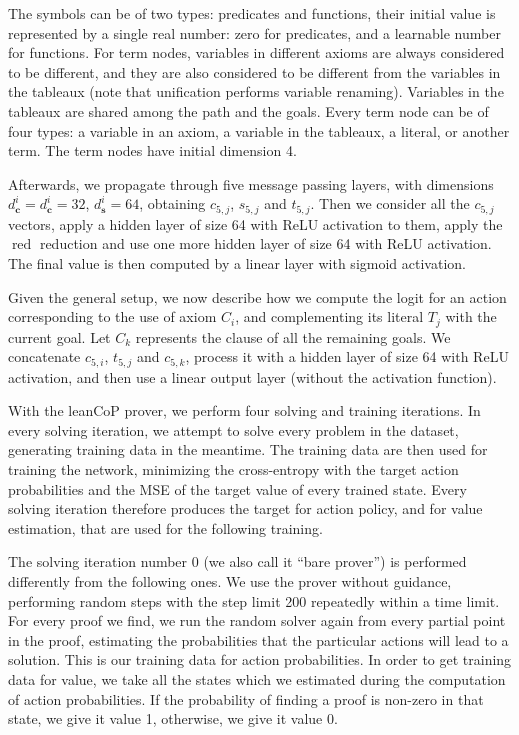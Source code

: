\documentclass{ecai}
\def\systemname#1{\textsf{#1}\xspace}
\newcommand{\lc}{\systemname{leanCoP}}
\newcommand{\red}{\mathop{\mathrm{red}}\limits}
\begin{document}
The symbols can be of two types: predicates and functions, their
initial value is represented by a single real number: zero for
predicates, and a learnable number for functions. For term nodes,
variables in different axioms are always considered to be different,
and they are also considered to be different from the variables in the
tableaux (note that unification performs variable renaming). Variables in the tableaux are shared among the path and the
goals. Every term node can be of four types: a variable in an axiom,
a variable in the tableaux, a literal, or another term. The term nodes have
initial dimension 4.

Afterwards, we propagate through five message passing layers, with
dimensions $d_{\mathbf c}^i = d_{\mathbf c}^i = 32$,
$d_{\mathbf s}^i = 64$, obtaining $c_{5,j}$, $s_{5,j}$ and $t_{5,j}$.
Then we consider all the $c_{5,j}$ vectors, apply
a hidden layer of size 64 with ReLU activation to them, apply
the $\red$ reduction and use one more hidden layer of size 64 with ReLU
activation. The final value %
is then computed by a linear
layer with sigmoid activation.

Given the general setup, we now describe how we compute the logit for an action corresponding to the use of axiom
$C_i$, and complementing its literal $T_j$ with the current goal. Let
$C_k$ represents the clause of all the remaining goals. We concatenate
$c_{5,i}$, $t_{5,j}$ and $c_{5,k}$, process it with a hidden layer
of size 64 with ReLU activation, and then use a linear output layer
(without the activation function).

With the \lc prover, we perform four solving and training
iterations. In every solving iteration, we attempt to solve every problem in
the dataset, generating training data in the meantime. The training
data are then used for training the network, minimizing the
cross-entropy with the target action probabilities and the MSE of the
target value of every trained state. Every solving iteration therefore
produces the target for action policy, and for value estimation, that are used
for the following training.

The solving iteration number 0 (we also call it ``bare prover'') is
performed differently from the 
following ones. We use the prover without guidance, performing random
steps with the step limit 200 repeatedly within a time limit.
For every proof we find, we run the random solver again from every
partial point in the proof, estimating the probabilities that the
particular actions will lead to a solution. This is our training data
for action probabilities. In order to get training data for value, we take all the states which we
estimated during the computation of action probabilities. If the
probability of finding a proof is non-zero in that state, we give it value
1, otherwise, we give it value 0.
\end{document}
